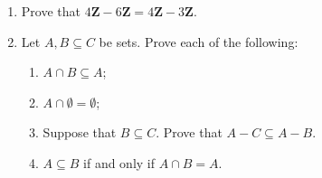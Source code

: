 \documentclass[12pt, reqno]{amsart}
\begin{document}
\begin{enumerate}
\vspace{10pt}

\item Prove that $4\mathbf{Z} - 6\mathbf{Z} = 4\mathbf{Z} - 3\mathbf{Z}$.
\vspace{10pt}

\item Let $A,B \subseteq C$ be sets. Prove each of the following:
 \begin{enumerate}
 \item $A \cap B \subseteq A$;
 \item $A \cap \emptyset = \emptyset$;
 \item Suppose that $B \subseteq C$. Prove that $A-C \subseteq A-B$.
 \item $A \subseteq B$ if and only if $A \cap B = A$.
 \end{enumerate}

\end{enumerate}
\end{document}
